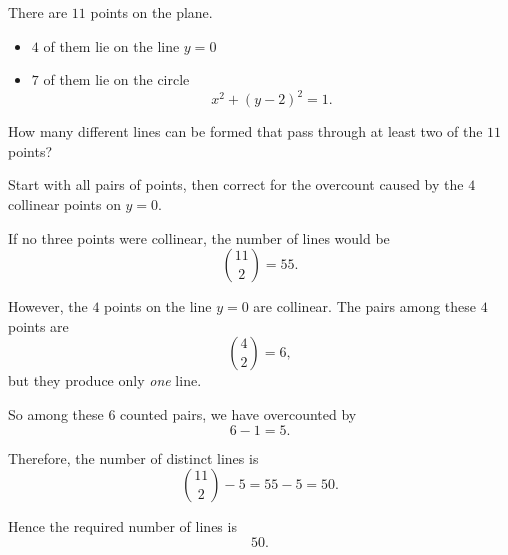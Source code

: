 \begin{problem}
There are $11$ points on the plane.

\begin{itemize}[leftmargin=*]
\item $4$ of them lie on the line $y=0$
\item $7$ of them lie on the circle
\[
x^2+(y-2)^2=1.
\]
\end{itemize}


How many different lines can be formed that pass through at least two of the $11$ points?

\begin{center}
\end{center}
\end{problem}

\begin{hint}
Start with all pairs of points, then correct for the overcount caused by the $4$ collinear points on $y=0$.
\end{hint}

\begin{solution}
If no three points were collinear, the number of lines would be
\[
\binom{11}{2}=55.
\]

However, the $4$ points on the line $y=0$ are collinear. The pairs among these $4$ points are
\[
\binom{4}{2}=6,
\]
but they produce only \emph{one} line.

So among these $6$ counted pairs, we have overcounted by
\[
6-1=5.
\]

Therefore, the number of distinct lines is
\[
\binom{11}{2}-5 = 55-5 = 50.
\]

Hence the required number of lines is
\[
\boxed{50}.
\]
\end{solution}

